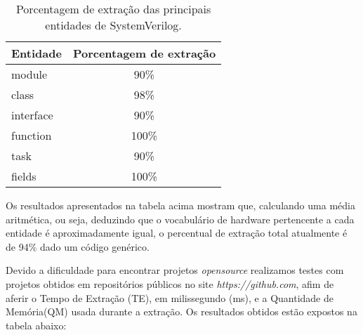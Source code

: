 \documentclass[12pt, twocolumn, a4paper]{article}
\begin{document}
\begin{table}[h]
\centering
\caption{Porcentagem de extração das principais entidades de SystemVerilog.}
	\begin{tabular}{l|c}
	\hline
	Entidade  & Porcentagem de extração\\
	\hline
	module     & 90\% \\
	\hline
	class 	   & 98\% \\
	\hline
	interface  & 90\% \\
	\hline
	function   & 100\% \\
	\hline
	task       & 90\% \\
	\hline
	fields     & 100\% \\
	\hline
	
	\end{tabular}

\end{table}
Os resultados apresentados na tabela acima mostram que, calculando uma média aritmética, ou seja, deduzindo que o vocabulário de hardware pertencente a cada entidade é aproximadamente igual, o percentual de extração total atualmente é de 94\% dado um código genérico.

Devido a dificuldade para encontrar projetos \textit{opensource} realizamos testes com projetos obtidos em repositórios públicos no site \textit{https://github.com}, afim de aferir o Tempo de Extração (TE), em milissegundo (ms), e a Quantidade de Memória(QM) usada durante a extração. Os resultados obtidos estão expostos na tabela abaixo:
	
\end{document}
